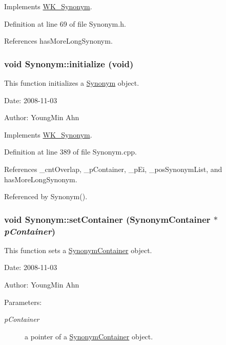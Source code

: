 Implements \hyperlink{classWK__Synonym_71c1c134392af940e8e2a1e003c511cf}{WK\_\-Synonym}.

Definition at line 69 of file Synonym.h.

References hasMoreLongSynonym.\hypertarget{classkmaOrange_1_1Synonym_7628a45375a8b5ac25f5f572a0e0b368}{
\subsubsection[{initialize}]{\setlength{\rightskip}{0pt plus 5cm}void Synonym::initialize (void)}}
\label{classkmaOrange_1_1Synonym_7628a45375a8b5ac25f5f572a0e0b368}


This function initializes a \hyperlink{classkmaOrange_1_1Synonym}{Synonym} object. 

\begin{Desc}
\item[Date:]2008-11-03 \end{Desc}
\begin{Desc}
\item[Author:]YoungMin Ahn \end{Desc}


Implements \hyperlink{classWK__Synonym_f76814cfdd7eb55208f0370481aaa398}{WK\_\-Synonym}.

Definition at line 389 of file Synonym.cpp.

References \_\-cntOverlap, \_\-pContainer, \_\-pEi, \_\-posSynonymList, and hasMoreLongSynonym.

Referenced by Synonym().\hypertarget{classkmaOrange_1_1Synonym_e39f24c0c406a842b06f878268246fc1}{
\subsubsection[{setContainer}]{\setlength{\rightskip}{0pt plus 5cm}void Synonym::setContainer ({\bf SynonymContainer} $\ast$ {\em pContainer})}}
\label{classkmaOrange_1_1Synonym_e39f24c0c406a842b06f878268246fc1}


This function sets a \hyperlink{classkmaOrange_1_1SynonymContainer}{SynonymContainer} object. 

\begin{Desc}
\item[Date:]2008-11-03 \end{Desc}
\begin{Desc}
\item[Author:]YoungMin Ahn \end{Desc}
\begin{Desc}
\item[Parameters:]
\begin{description}
\item[{\em pContainer}]a pointer of a \hyperlink{classkmaOrange_1_1SynonymContainer}{SynonymContainer} object. \end{description}
\end{Desc}


